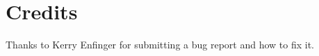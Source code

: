 \chapter{Credits }
\hypertarget{_credits}{}\label{_credits}
Thanks to Kerry Enfinger for submitting a bug report and how to fix it. 